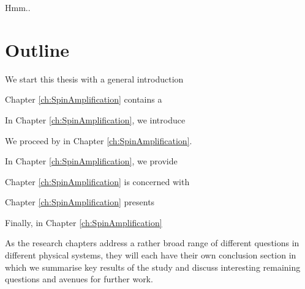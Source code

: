 Hmm.. 

\section{Outline}

We start this thesis with a general introduction 

Chapter \ref{ch:SpinAmplification} contains a 

In Chapter \ref{ch:SpinAmplification}, we introduce 

We proceed by  in Chapter \ref{ch:SpinAmplification}. 

In Chapter \ref{ch:SpinAmplification}, we provide 

Chapter \ref{ch:SpinAmplification} is concerned with 

Chapter \ref{ch:SpinAmplification} presents 

Finally, in Chapter \ref{ch:SpinAmplification} 

As the research chapters address a rather broad range of different questions in different physical systems, they will each have their own conclusion section in which we summarise key results of the study and discuss interesting remaining questions and avenues for further work.


